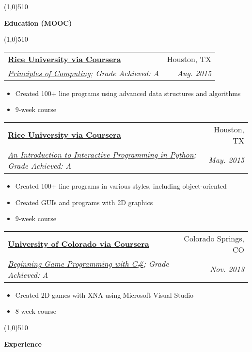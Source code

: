 \documentclass[letterpaper,11pt]{article}
\makeatletter
\newcommand{\resitem}[1]{\item #1 \vspace{-2pt}}
\newcommand{\resheading}[1]{{\large {\begin{minipage}{\textwidth}{\textbf{#1 \vphantom{p\^{E}}}}\end{minipage}}}}
\newcommand{\ressubheading}[4]{
\begin{tabular*}{6.5in}{l@{\extracolsep{\fill}}r}
		\textbf{#1} & #2 \\
		\textit{#3} & \textit{#4} \\
\end{tabular*}\vspace{-6pt}}
\makeatother
\begin{document}
\line(1,0){510}

\resheading{Education (MOOC)}

\line(1,0){510}

	\begin{description}

	\item
		\ressubheading {\href{http://www.rice.edu/}{Rice University via Coursera}}{Houston, TX}{\href{http://www.codeskulptor.org/coursera/principlescomputing.html}{Principles of Computing};  {Grade Achieved: A}}{ \footnotesize{Aug. 2015}}
		{ \footnotesize
				\begin{itemize}
					\resitem{Created 100+ line programs using advanced data structures and algorithms}
					\resitem{9-week course}
				\end{itemize}	}
	\item	
		\ressubheading {\href{http://www.rice.edu/}{Rice University via Coursera}}{Houston, TX}{\href{http://www.codeskulptor.org/coursera/interactivepython.html}{An Introduction to Interactive Programming in Python};  {Grade Achieved: A}}{ \footnotesize{May. 2015}}
		{ \footnotesize
				\begin{itemize}
					\resitem{Created 100+ line programs in various styles, including object-oriented}
					\resitem{Created GUIs and programs with 2D graphics}
					\resitem{9-week course}
					
				\end{itemize}	}
	\item	
		\ressubheading {\href{http://www.uccs.edu/}{University of Colorado via Coursera}}{Colorado Springs, CO}{\href{https://www.coursera.org/course/gameprogramming}{Beginning Game Programming with C\#};  {Grade Achieved: A}}{ \footnotesize{Nov. 2013}}	
			{ \footnotesize
		\begin{itemize}
					\resitem{Created 2D games with XNA using Microsoft Visual Studio}
					\resitem{8-week course}
				\end{itemize}	}	


	\end{description}

\line(1,0){510}

\resheading{Experience}
\end{document}
